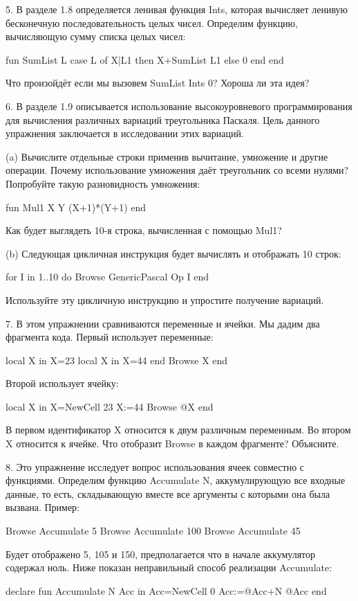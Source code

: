 5. В разделе 1.8 определяется ленивая функция Ints, которая вычисляет ленивую бесконечную последовательность целых чисел. Определим функцию, вычисляющую сумму списка целых чисел:

fun {SumList L}
case L of X|L1 then X+{SumList L1}
else 0 end
end

Что произойдёт если мы вызовем {SumList {Ints 0}}? Хороша ли эта идея?

6. В разделе 1.9 описывается использование высокоуровневого программирования для вычисления различных вариаций треугольника Паскаля. Цель данного упражнения заключается в исследовании этих вариаций.

(a) Вычислите отдельные строки применив вычитание, умножение и другие операции. Почему использование умножения даёт треугольник со всеми нулями? Попробуйте такую разновидность умножения:

fun {Mul1 X Y} (X+1)*(Y+1) end

Как будет выглядеть 10-я строка, вычисленная с помощью Mul1?

(b) Следующая цикличная инструкция будет вычислять и отображать 10 строк:

for I in 1..10 do {Browse {GenericPascal Op I}} end

Используйте эту цикличную инструкцию и упростите получение вариаций.

7. В этом упражнении сравниваются переменные и ячейки. Мы дадим два фрагмента кода. Первый использует переменные:

local X in
X=23
local X in
X=44
end
{Browse X}
end

Второй использует ячейку:

local X in
X={NewCell 23}
X:=44
{Browse @X}
end

В первом идентификатор X относится к двум различным переменным. Во втором X относится к ячейке. Что отобразит Browse в каждом фрагменте? Объясните.

8. Это упражнение исследует вопрос использования ячеек совместно с функциями. Определим функцию {Accumulate N}, аккумулирующую все входные данные, то есть, складывающую вместе все аргументы с которыми она была вызвана. Пример:

{Browse {Accumulate 5}}
{Browse {Accumulate 100}}
{Browse {Accumulate 45}}

Будет отображено 5, 105 и 150, предполагается что в начале аккумулятор содержал ноль. Ниже показан неправильный способ реализации Accumulate:

declare
fun {Accumulate N}
Acc in
Acc={NewCell 0}
Acc:=@Acc+N
@Acc
end

